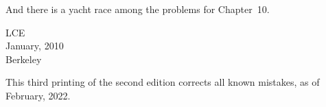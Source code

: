 And there is a yacht race among the problems for Chapter~10.

\begin{flushright}
LCE\\
January, 2010\\
Berkeley
\end{flushright}

This third printing of the second edition corrects all known mistakes, as of
February, 2022.
